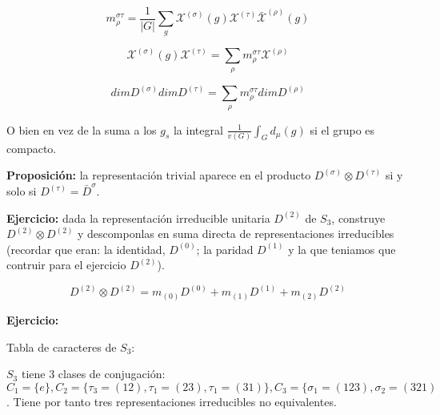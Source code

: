 \documentclass{article}
\begin{document}
$$m_\rho ^{\sigma \tau} =\frac{1}{|G|} \sum _g \mathcal{X}^{(\sigma)}(g)\mathcal{X}^{(\tau)}\bar{\mathcal{X}}^{(\rho)}(g)$$

$$\mathcal{X}^{(\sigma)}(g)\mathcal{X}^{(\tau)}= \sum _\rho m_\rho ^{\sigma \tau}\mathcal{X}^{(\rho)}$$

$$dimD^{(\sigma)}dim D^{(\tau)}=\sum _\rho m_\rho ^{\sigma \tau} dimD^{(\rho)}$$

O bien en vez de la suma a los $g_s$ la integral $\frac{1}{v(G)}\int _G d_\mu (g)$ si el grupo es compacto.

\smallskip
\textbf{Proposición:} la representación trivial aparece en el producto $D^{(\sigma)}\otimes D^{(\tau)}$ si y solo si $D^{(\tau)}= \bar{D}^{\sigma}$.

\smallskip
\textbf{Ejercicio:} dada la representación irreducible unitaria $D^{(2)}$ de $S_3$, construye $D^{(2)}\otimes D^{(2)}$ y descomponlas en suma directa de representaciones irreducibles (recordar que eran: la identidad, $D^{(0)}$; la paridad $D^{(1)}$ y la que teniamos que contruir para el ejercicio $D^{(2)}$).

$$D^{(2)}\otimes D^{(2)}=m_{(0)}D^{(0)}+m_{(1)}D^{(1)}+m_{(2)}D^{(2)}$$

\textbf{Ejercicio:}

\smallskip
Tabla de caracteres de $S_3$:

\smallskip
$S_3$ tiene 3 clases de conjugación: $C_1=\lbrace e \rbrace, C_2= \lbrace \tau _3=(12),\tau _1=(23), \tau _1=(31)\rbrace, C_3=\lbrace \sigma _1=(123),\sigma _2=(321)$. Tiene por tanto tres representaciones irreducibles no equivalentes.
\end{document}

